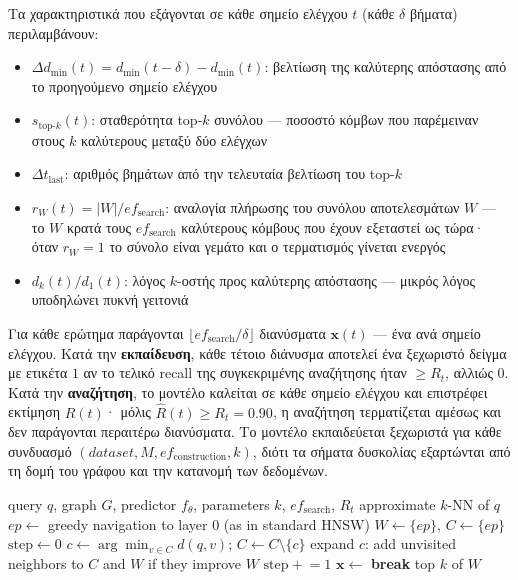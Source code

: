 \documentclass[12pt,a4paper]{article}
\begin{document}
Τα χαρακτηριστικά που εξάγονται σε κάθε σημείο ελέγχου $t$ (κάθε $\delta$ βήματα) περιλαμβάνουν:
\begin{itemize}
    \item $\Delta d_{\min}(t) = d_{\min}(t-\delta) - d_{\min}(t)$: βελτίωση της καλύτερης απόστασης από το προηγούμενο σημείο ελέγχου
    \item $s_{\text{top-}k}(t)$: σταθερότητα top-$k$ συνόλου — ποσοστό κόμβων που παρέμειναν στους $k$ καλύτερους μεταξύ δύο ελέγχων
    \item $\Delta t_{\text{last}}$: αριθμός βημάτων από την τελευταία βελτίωση του top-$k$
    \item $r_W(t) = |W|/ef_{\text{search}}$: αναλογία πλήρωσης του συνόλου αποτελεσμάτων $W$ --- το $W$ κρατά τους $ef_{\text{search}}$ καλύτερους κόμβους που έχουν εξεταστεί ως τώρα· όταν $r_W = 1$ το σύνολο είναι γεμάτο και ο τερματισμός γίνεται ενεργός
    \item $d_k(t)/d_1(t)$: λόγος $k$-οστής προς καλύτερης απόστασης — μικρός λόγος υποδηλώνει πυκνή γειτονιά
\end{itemize}
Για κάθε ερώτημα παράγονται $\lfloor ef_{\text{search}} / \delta \rfloor$ διανύσματα $\mathbf{x}(t)$ --- ένα ανά σημείο ελέγχου. Κατά την \textbf{εκπαίδευση}, κάθε τέτοιο διάνυσμα αποτελεί ένα ξεχωριστό δείγμα με ετικέτα $1$ αν το τελικό recall της συγκεκριμένης αναζήτησης ήταν $\geq R_t$, αλλιώς $0$. Κατά την \textbf{αναζήτηση}, το μοντέλο καλείται σε κάθε σημείο ελέγχου και επιστρέφει εκτίμηση $\hat{R}(t)$· μόλις $\hat{R}(t) \geq R_t = 0.90$, η αναζήτηση τερματίζεται αμέσως και δεν παράγονται περαιτέρω διανύσματα. Το μοντέλο εκπαιδεύεται ξεχωριστά για κάθε συνδυασμό $(dataset, M, ef_{\text{construction}}, k)$, διότι τα σήματα δυσκολίας εξαρτώνται από τη δομή του γράφου και την κατανομή των δεδομένων.

\begin{algorithm}[H]
\caption{DARTH: Search with Learned Early Termination}
\label{alg:darth}
\begin{algorithmic}[1]
\Require query $q$, graph $G$, predictor $f_\theta$, parameters $k$, $ef_{\text{search}}$, $R_t$
\Ensure approximate $k$-NN of $q$
\State $ep \leftarrow$ greedy navigation to layer 0 (as in standard HNSW)
\State $W \leftarrow \{ep\}$, $C \leftarrow \{ep\}$ 
\State $\text{step} \leftarrow 0$
    \State $c \leftarrow \arg\min_{v \in C} d(q, v)$; $C \leftarrow C \setminus \{c\}$
    \State expand $c$: add unvisited neighbors to $C$ and $W$ if they improve $W$
    \State $\text{step} \mathrel{+}= 1$
     
        \State $\mathbf{x} \leftarrow$ 
            \State \textbf{break} 
        \EndIf
    \EndIf
\EndWhile
\State \Return top $k$ of $W$
\end{algorithmic}
\end{algorithm}
\end{document}

